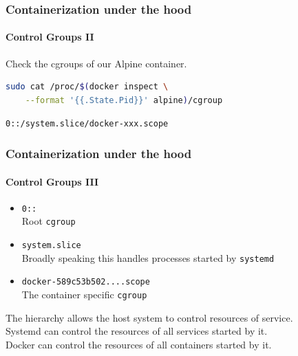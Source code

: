 \begin{frame}[fragile]
    \frametitle{Containerization under the hood}
    \framesubtitle{Control Groups II}
    Check the cgroups of our Alpine container.
    \vspace{0.5cm}
    \begin{lstlisting}[language=bash]
sudo cat /proc/$(docker inspect \
    --format '{{.State.Pid}}' alpine)/cgroup
    \end{lstlisting}
    \vspace{0.5cm}
    \texttt{0::/system.slice/docker-xxx.scope}
\end{frame}

\begin{frame}
    \frametitle{Containerization under the hood}
    \framesubtitle{Control Groups III}
    \begin{itemize}
        \item \texttt{0::}\\
        Root \texttt{cgroup}
        \item \texttt{system.slice}\\
        Broadly speaking this handles processes started by \texttt{systemd}
        \item \texttt{docker-589c53b502....scope}\\
        The container specific \texttt{cgroup}
    \end{itemize}
    \vspace{0.5cm}
    The hierarchy allows the host system to control resources of service.\\
    Systemd can control the resources of all services started by it.\\
    Docker can control the resources of all containers started by it.
\end{frame}
